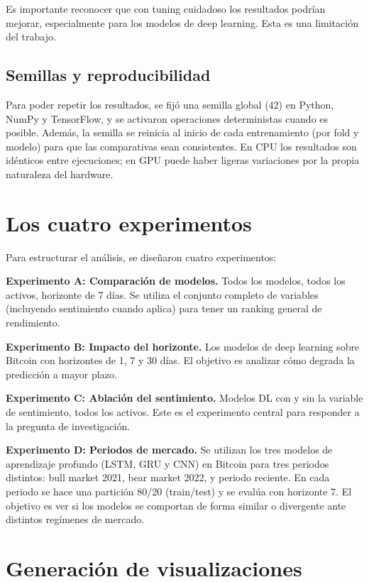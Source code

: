 Es importante reconocer que con tuning cuidadoso los resultados podrían mejorar, especialmente para los modelos de deep learning. Esta es una limitación del trabajo.

\subsection{Semillas y reproducibilidad}

Para poder repetir los resultados, se fijó una semilla global (42) en Python, NumPy y TensorFlow, y se activaron operaciones deterministas cuando es posible. Además, la semilla se reinicia al inicio de cada entrenamiento (por fold y modelo) para que las comparativas sean consistentes. En CPU los resultados son idénticos entre ejecuciones; en GPU puede haber ligeras variaciones por la propia naturaleza del hardware.

\section{Los cuatro experimentos}

Para estructurar el análisis, se diseñaron cuatro experimentos:

\textbf{Experimento A: Comparación de modelos.} Todos los modelos, todos los activos, horizonte de 7 días. Se utiliza el conjunto completo de variables (incluyendo sentimiento cuando aplica) para tener un ranking general de rendimiento.

\textbf{Experimento B: Impacto del horizonte.} Los modelos de deep learning sobre Bitcoin con horizontes de 1, 7 y 30 días. El objetivo es analizar cómo degrada la predicción a mayor plazo.

\textbf{Experimento C: Ablación del sentimiento.} Modelos DL con y sin la variable de sentimiento, todos los activos. Este es el experimento central para responder a la pregunta de investigación.

\textbf{Experimento D: Periodos de mercado.} Se utilizan los tres modelos de aprendizaje profundo (LSTM, GRU y CNN) en Bitcoin para tres periodos distintos: bull market 2021, bear market 2022, y periodo reciente. En cada periodo se hace una partición 80/20 (train/test) y se evalúa con horizonte 7. El objetivo es ver si los modelos se comportan de forma similar o divergente ante distintos regímenes de mercado.

\section{Generación de visualizaciones}

